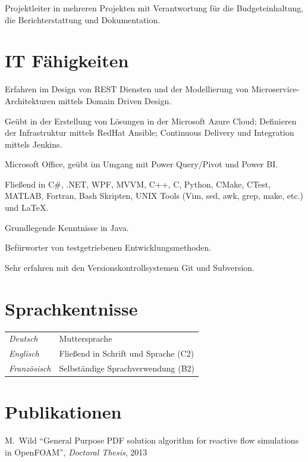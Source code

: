 \documentclass[line,11pt,a4paper]{../resume}
\begin{document}
\begin{resume}
\begin{list2}
  \item Projektleiter in mehreren Projekten mit Verantwortung für die
    Budgeteinhaltung, die Berichterstattung und Dokumentation.
\end{list2}

\pagebreak
\section{\mysidestyle IT Fähigkeiten}\vspace{6mm}
\begin{list2}
  \item Erfahren im Design von REST Diensten und der Modellierung von
    Microservice-Architekturen mittels Domain Driven Design.
  \item Geübt in der Erstellung von Lösungen in der Microsoft Azure Cloud;
    Definieren der Infrastruktur mittels RedHat Ansible; Continuous Delivery
    und Integration mittels Jenkins.
  \item Microsoft Office, geübt im Umgang mit Power Query/Pivot und Power BI.
  \item Flie{\ss}end in C\#, .NET, WPF, MVVM, C++, C, Python, CMake, CTest,
    MATLAB, Fortran, Bash Skripten, UNIX Tools (Vim, sed, awk, grep, make,
    etc.) und {\selectfont\LaTeX}.
  \item Grundlegende Kenntnisse in Java.
  \item Befürworter von testgetriebenen Entwicklungsmethoden.
  \item Sehr erfahren mit den Versionskontrollsystemen Git und Subversion.
\end{list2}

\section{\mysidestyle Sprachkentnisse}\vspace{2mm}
\begin{tabular}{@{}ll}
  \textsl{Deutsch}   & Muttersprache \\
  \textsl{Englisch}  & Flie{\ss}end in Schrift und Sprache (C2) \\
  \textsl{Französisch}  & Selbständige Sprachverwendung (B2) \\
\end{tabular}

\section{\mysidestyle Publikationen}\vspace{2mm}
M.~Wild
``General Purpose PDF solution algorithm for reactive flow simulations in
OpenFOAM'', \textsl{Doctoral Thesis}, 2013


\end{resume}
\end{document}
